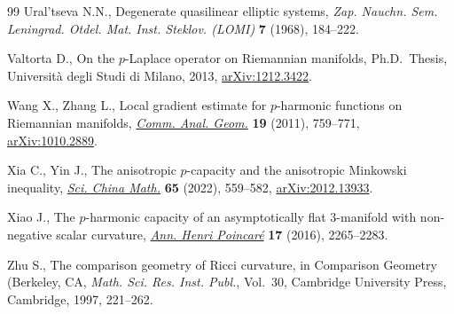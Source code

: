 \documentclass[10pt,a4paper]{amsart}
\numberwithin{equation}{section}
\begin{document}
\begin{thebibliography}{99}
Ural'tseva N.N., Degenerate quasilinear elliptic systems, \textit{Zap. Nauchn.
 Sem. Leningrad. Otdel. Mat. Inst. Steklov. (LOMI)} \textbf{7} (1968),
 184--222.

Valtorta D., On the $p$-{L}aplace operator on {R}iemannian manifolds, Ph.D.~Thesis, {U}niversit\`a degli Studi di Milano, 2013, \href{https://arxiv.org/abs/1212.3422}{arXiv:1212.3422}.

Wang X., Zhang L., Local gradient estimate for {$p$}-harmonic functions on
 {R}iemannian manifolds, \href{https://doi.org/10.4310/CAG.2011.v19.n4.a4}{\textit{Comm. Anal. Geom.}} \textbf{19} (2011),
 759--771, \href{https://arxiv.org/abs/1010.2889}{arXiv:1010.2889}.

Xia C., Yin J., The anisotropic {$p$}-capacity and the anisotropic {M}inkowski
 inequality, \href{https://doi.org/10.1007/s11425-021-1884-1}{\textit{Sci. China Math.}} \textbf{65} (2022), 559--582,
 \href{https://arxiv.org/abs/2012.13933}{arXiv:2012.13933}.

Xiao J., The {$p$}-harmonic capacity of an asymptotically flat 3-manifold with
 non-negative scalar curvature, \href{https://doi.org/10.1007/s00023-016-0475-8}{\textit{Ann. Henri Poincar\'e}} \textbf{17}
 (2016), 2265--2283.

Zhu S., The comparison geometry of {R}icci curvature, in Comparison {G}eometry
 ({B}erkeley, {CA}, \textit{Math. Sci. Res. Inst. Publ.}, Vol.~30, Cambridge
 University Press, Cambridge, 1997, 221--262.

\end{thebibliography}
\end{document}
